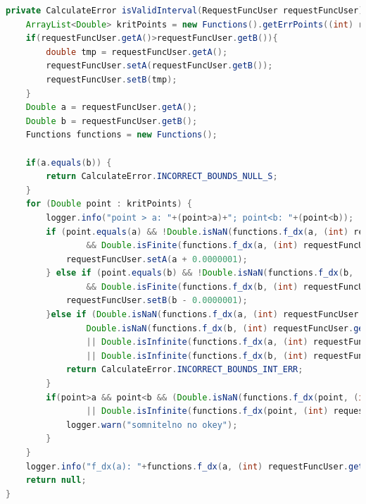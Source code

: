 \documentclass{article}
\begin{document}
\begin{lstlisting}[language=Java, caption={Первый узел валидации}]
private CalculateError isValidInterval(RequestFuncUser requestFuncUser) {
    ArrayList<Double> kritPoints = new Functions().getErrPoints((int) requestFuncUser.getTypeFunc());
    if(requestFuncUser.getA()>requestFuncUser.getB()){
        double tmp = requestFuncUser.getA();
        requestFuncUser.setA(requestFuncUser.getB());
        requestFuncUser.setB(tmp);
    }
    Double a = requestFuncUser.getA();
    Double b = requestFuncUser.getB();
    Functions functions = new Functions();

    if(a.equals(b)) {
        return CalculateError.INCORRECT_BOUNDS_NULL_S;
    }
    for (Double point : kritPoints) {
        logger.info("point > a: "+(point>a)+"; point<b: "+(point<b));
        if (point.equals(a) && !Double.isNaN(functions.f_dx(a, (int) requestFuncUser.getTypeFunc()))
                && Double.isFinite(functions.f_dx(a, (int) requestFuncUser.getTypeFunc()))) {
            requestFuncUser.setA(a + 0.0000001);
        } else if (point.equals(b) && !Double.isNaN(functions.f_dx(b, (int) requestFuncUser.getTypeFunc()))
                && Double.isFinite(functions.f_dx(b, (int) requestFuncUser.getTypeFunc()))) {
            requestFuncUser.setB(b - 0.0000001);
        }else if (Double.isNaN(functions.f_dx(a, (int) requestFuncUser.getTypeFunc())) ||
                Double.isNaN(functions.f_dx(b, (int) requestFuncUser.getTypeFunc()))
                || Double.isInfinite(functions.f_dx(a, (int) requestFuncUser.getTypeFunc()))
                || Double.isInfinite(functions.f_dx(b, (int) requestFuncUser.getTypeFunc()))) {
            return CalculateError.INCORRECT_BOUNDS_INT_ERR;
        }
        if(point>a && point<b && (Double.isNaN(functions.f_dx(point, (int) requestFuncUser.getTypeFunc()))
                || Double.isInfinite(functions.f_dx(point, (int) requestFuncUser.getTypeFunc())) )){
            logger.warn("somnitelno no okey");
        }
    }
    logger.info("f_dx(a): "+functions.f_dx(a, (int) requestFuncUser.getTypeFunc())+"; f_dx(b): "+functions.f_dx(b, (int) requestFuncUser.getTypeFunc()));
    return null;
} 
\end{lstlisting}
\end{document}
